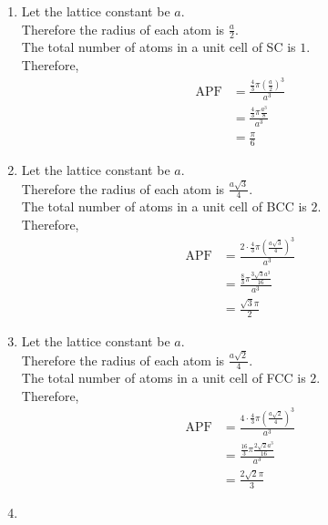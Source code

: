 \documentclass[fleqn, a4paper, 11pt, oneside]{amsart}
\theoremstyle{definition}
\theoremstyle{theorem}
\begin{document}
\begin{solution}
	\begin{enumerate}[leftmargin=*]
		\item
			Let the lattice constant be $a$.\\
			Therefore the radius of each atom is $\frac{a}{2}$.\\
			The total number of atoms in a unit cell of SC is $1$.\\
			Therefore,
			\begin{align*}
				\text{APF} & = \frac{\frac{4}{3} \pi \left( \frac{a}{2} \right)^3}{a^3} \\
                                           & = \frac{\frac{4}{3} \pi \frac{a^3}{8}}{a^3}                \\
                                           & = \frac{\pi}{6}
			\end{align*}
		\item
			Let the lattice constant be $a$.\\
			Therefore the radius of each atom is $\frac{a \sqrt{3}}{4}$.\\
			The total number of atoms in a unit cell of BCC is $2$.\\
			Therefore,
			\begin{align*}
				\text{APF} & = \frac{2 \cdot \frac{4}{3} \pi \left( \frac{a \sqrt{3}}{4} \right)^3}{a^3} \\
                                           & = \frac{\frac{8}{3} \pi \frac{3 \sqrt{3} a^3}{16}}{a^3}                     \\
                                           & = \frac{\sqrt{3} \pi}{2}
			\end{align*}
		\item
			Let the lattice constant be $a$.\\
			Therefore the radius of each atom is $\frac{a \sqrt{2}}{4}$.\\
			The total number of atoms in a unit cell of FCC is $2$.\\
			Therefore,
			\begin{align*}
				\text{APF} & = \frac{4 \cdot \frac{4}{3} \pi \left( \frac{a \sqrt{2}}{4} \right)^3}{a^3} \\
                                           & = \frac{\frac{16}{3} \pi \frac{2 \sqrt{2} a^3}{16}}{a^3}                    \\
                                           & = \frac{2 \sqrt{2} \pi}{3}
			\end{align*}
		\item

\end{enumerate}
\end{solution}
\end{document}
